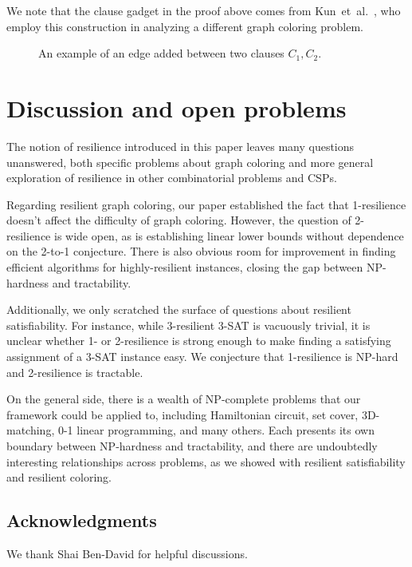 \documentclass[10pt]{article}
\begin{document}
We note that the clause gadget in the proof above 
comes from Kun~et~al.~\cite{KunPR13}, who employ this 
construction in analyzing a different graph coloring problem.


\begin{figure}
\centering
{}
\caption{An example of an edge added between two clauses $C_1, C_2$.}
\label{fig:clause-clause-example}
\end{figure}



\section{Discussion and open problems} \label{sec:open-problems}

The notion of resilience introduced in this paper leaves many questions
unanswered, both specific problems about  graph coloring and more
general exploration of resilience in other combinatorial problems and CSPs. 

Regarding resilient graph coloring, our paper established the fact that
1-resilience doesn't affect the difficulty of graph coloring. However, the
question of 2-resilience is wide open, as is establishing linear lower bounds
without dependence on the 2-to-1 conjecture. There is also obvious room for
improvement in finding efficient algorithms for highly-resilient instances,
closing the gap between NP-hardness and tractability.

Additionally, we only scratched the surface of questions about resilient
satisfiability. For instance, while 3-resilient 3-SAT is vacuously trivial, it
is unclear whether 1- or 2-resilience is strong enough to make finding a
satisfying assignment of a 3-SAT instance easy. We conjecture that 1-resilience
is NP-hard and 2-resilience is tractable.

On the general side, there is a wealth of NP-complete problems that our
framework could be applied to, including Hamiltonian circuit, set cover,
3D-matching, 0-1 linear programming, and many others. Each presents its own
boundary between NP-hardness and tractability, and there are undoubtedly
interesting relationships across problems, as we showed with resilient
satisfiability and resilient coloring.

\subsection*{Acknowledgments}
We thank Shai Ben-David for helpful discussions.




\end{document}
